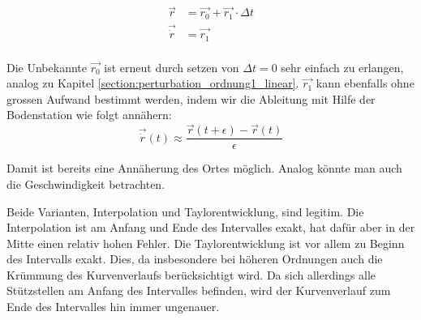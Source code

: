 \begin{equation}
\label{eq:ordnung1_taylor_ansatz}
\begin{aligned}
\vec{r} &=  \vec{r_0} + \vec{r_1} \cdot \Delta t \\
\vec{\dot{r}} &= \vec{r_1} \\
\end{aligned}
\end{equation}

Die Unbekannte $\vec{r_0}$ ist erneut durch setzen von $\Delta t = 0$ sehr einfach zu erlangen, analog zu Kapitel \ref{section:perturbation_ordnung1_linear}.
$\vec{r_1}$ kann ebenfalls ohne grossen Aufwand bestimmt werden, indem wir die Ableitung mit Hilfe der Bodenstation wie folgt annähern:
\[
\vec{\dot{r}}(t) \approx \frac{\vec{r}(t+\epsilon) - \vec{r}(t)}{\epsilon}
\]

Damit ist bereits eine Annäherung des Ortes möglich.
Analog könnte man auch die Geschwindigkeit betrachten.

Beide Varianten, Interpolation und Taylorentwicklung, sind legitim.
Die Interpolation ist am Anfang und Ende des Intervalles exakt, hat dafür aber in der Mitte einen relativ hohen Fehler.
Die Taylorentwicklung ist vor allem zu Beginn des Intervalls exakt.
Dies, da insbesondere bei höheren Ordnungen auch die Krümmung des Kurvenverlaufs berücksichtigt wird.
Da sich allerdings alle Stützstellen am Anfang des Intervalles befinden, wird der Kurvenverlauf zum Ende des Intervalles hin immer ungenauer.
